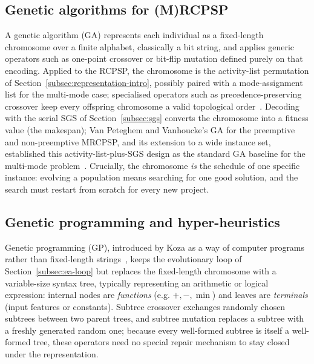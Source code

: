 \subsection{Genetic algorithms for (M)RCPSP}
\label{subsec:ga-rcpsp}

A genetic algorithm (GA) represents each individual as a fixed-length
chromosome over a finite alphabet, classically a bit string, and applies
generic operators such as one-point crossover or bit-flip mutation defined
purely on that encoding. Applied to the RCPSP, the
chromosome is the activity-list permutation of
Section~\ref{subsec:representation-intro}, possibly paired with a
mode-assignment list for the multi-mode case; specialised operators such as
precedence-preserving crossover keep every offspring chromosome a valid
topological order~\cite{hartmann1998,hartmann2002}. Decoding with the serial SGS
of Section~\ref{subsec:sgs} converts the chromosome into a fitness value (the
makespan); Van Peteghem and Vanhoucke's GA for the preemptive and
non-preemptive MRCPSP, and its extension to a wide instance set, established
this activity-list-plus-SGS design as the standard GA baseline for the multi-mode
problem~\cite{vanpeteghem2010,vanpeteghem2014}. Crucially, the chromosome
\emph{is} the schedule of one specific instance: evolving a population means
searching for one good solution, and the search must restart from scratch for
every new project.

\subsection{Genetic programming and hyper-heuristics}
\label{subsec:gp-hh}

Genetic programming (GP), introduced by Koza as a way of  computer
programs rather than fixed-length strings~\cite{koza1994gp}, keeps the
evolutionary loop of
Section~\ref{subsec:ea-loop} but replaces the fixed-length chromosome with a
variable-size syntax tree, typically representing an arithmetic or logical
expression: internal nodes are \emph{functions} (e.g. $+, -, \min$) and leaves
are \emph{terminals} (input features or constants).
Subtree crossover exchanges randomly chosen subtrees between two parent trees,
and subtree mutation replaces a subtree with a freshly generated random one;
because every well-formed subtree is itself a well-formed tree, these operators
need no special repair mechanism to stay closed under the representation.

